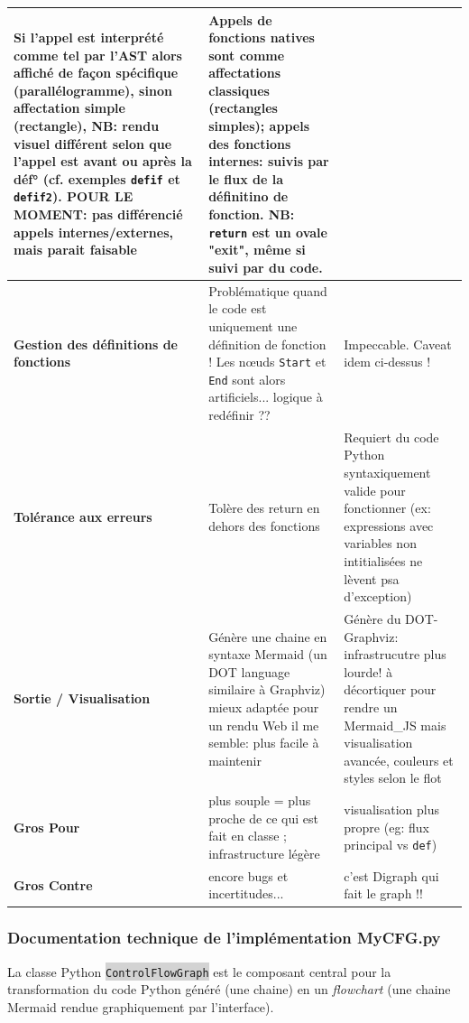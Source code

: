 \documentclass[11pt,a4paper]{article}
\newcommand{\code}[1]{\colorbox{lightgray}{\texttt{\small #1}}}
\begin{document}
\begin{longtable}{|p{3cm}|p{7cm}|p{6cm}|}
Si l'appel est interprété comme tel par l'AST alors affiché de façon spécifique (parallélogramme), sinon affectation simple (rectangle), NB: rendu visuel différent selon que l'appel est avant ou après la déf° (cf. exemples \texttt{defif} et \texttt{defif2}). POUR LE MOMENT: pas différencié appels internes/externes, mais parait faisable & 
Appels de fonctions natives sont comme affectations classiques (rectangles simples); appels des fonctions internes: suivis par le flux de la définitino de fonction. NB: \texttt{return} est un ovale "exit", même si suivi par du code. \\
\hline
\textbf{Gestion des définitions de fonctions} & 
Problématique quand le code est uniquement une définition de fonction ! Les nœuds \texttt{Start} et \texttt{End} sont alors artificiels... logique à redéfinir ??  & 
Impeccable. Caveat idem ci-dessus ! \\
\hline
\textbf{Tolérance aux erreurs} & 
Tolère des return en dehors des fonctions & 
Requiert du code Python syntaxiquement valide pour fonctionner (ex: expressions avec variables non intitialisées ne lèvent psa d'exception) \\
\hline
\textbf{Sortie / Visualisation} & 
Génère une chaine en syntaxe Mermaid (un DOT language similaire à Graphviz) mieux adaptée pour un rendu Web il me semble: plus facile à maintenir & 
Génère du DOT-Graphviz: infrastrucutre plus lourde! à décortiquer pour rendre un Mermaid\_{JS} mais visualisation avancée, couleurs et styles selon le flot \\
\hline
\textbf{Gros Pour} & 
plus souple = plus proche de ce qui est fait en classe ; infrastructure légère & 
visualisation plus propre (eg: flux principal vs \texttt{def})  \\
\hline
\textbf{Gros Contre} & 
encore bugs et incertitudes... & 
c'est Digraph qui fait le graph !! \\
\hline
\end{longtable}

\subsubsection{Documentation technique de l’implémentation MyCFG.py}
La classe Python \code{ControlFlowGraph} est le composant central pour la transformation du code Python généré (une chaine) en un \textit{flowchart} (une chaine Mermaid rendue graphiquement par l'interface).
\end{document}
